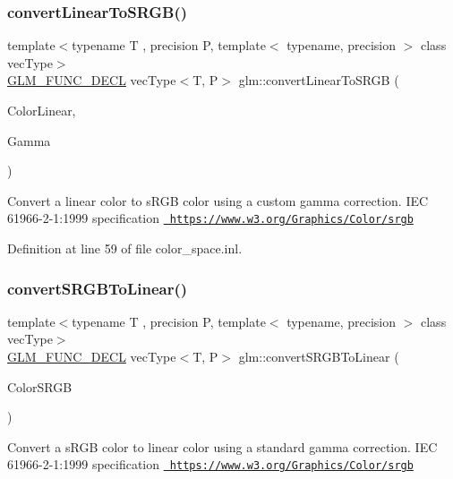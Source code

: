 \subsubsection{\texorpdfstring{convertLinearToSRGB()}{convertLinearToSRGB()}\hspace{0.1cm}{\footnotesize\ttfamily [2/2]}}
{\footnotesize\ttfamily template$<$typename T , precision P, template$<$ typename, precision $>$ class vec\+Type$>$ \\
\mbox{\hyperlink{setup_8hpp_ab2d052de21a70539923e9bcbf6e83a51}{G\+L\+M\+\_\+\+F\+U\+N\+C\+\_\+\+D\+E\+CL}} vec\+Type$<$T, P$>$ glm\+::convert\+Linear\+To\+S\+R\+GB (\begin{DoxyParamCaption}\item[{vec\+Type$<$ T, P $>$ const \&}]{Color\+Linear,  }\item[{T}]{Gamma }\end{DoxyParamCaption})}

Convert a linear color to s\+R\+GB color using a custom gamma correction. I\+EC 61966-\/2-\/1\+:1999 specification \href{https://www.w3.org/Graphics/Color/srgb}{\texttt{ https\+://www.\+w3.\+org/\+Graphics/\+Color/srgb}} 

Definition at line 59 of file color\+\_\+space.\+inl.

\mbox{\label{group__gtc__color__space_ga28e98e64347cf385cadc1ceb4def55c9}} 
\subsubsection{\texorpdfstring{convertSRGBToLinear()}{convertSRGBToLinear()}\hspace{0.1cm}{\footnotesize\ttfamily [1/2]}}
{\footnotesize\ttfamily template$<$typename T , precision P, template$<$ typename, precision $>$ class vec\+Type$>$ \\
\mbox{\hyperlink{setup_8hpp_ab2d052de21a70539923e9bcbf6e83a51}{G\+L\+M\+\_\+\+F\+U\+N\+C\+\_\+\+D\+E\+CL}} vec\+Type$<$T, P$>$ glm\+::convert\+S\+R\+G\+B\+To\+Linear (\begin{DoxyParamCaption}\item[{vec\+Type$<$ T, P $>$ const \&}]{Color\+S\+R\+GB }\end{DoxyParamCaption})}

Convert a s\+R\+GB color to linear color using a standard gamma correction. I\+EC 61966-\/2-\/1\+:1999 specification \href{https://www.w3.org/Graphics/Color/srgb}{\texttt{ https\+://www.\+w3.\+org/\+Graphics/\+Color/srgb}} 

